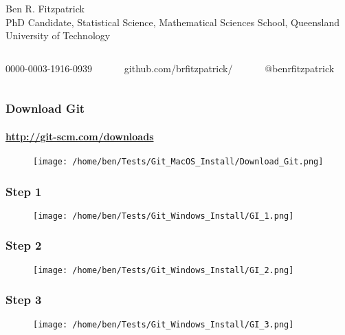 \documentclass[xcolor=dvipsnames]{beamer}
\begin{document}
\begin{frame}
\begin{figure}
\begin{columns}
\end{columns}
\end{figure}

\small Ben R. Fitzpatrick\\
\tiny PhD Candidate, Statistical Science, Mathematical Sciences School, Queensland University of Technology
\newline
\begin{columns}
\begin{column}{3cm}
\tiny 0000-0003-1916-0939
\end{column}
\begin{column}{3cm}
\tiny github.com/brfitzpatrick/
\end{column}
\begin{column}{3cm}
\tiny @benrfitzpatrick
\end{column}
\end{columns}
\end{frame}

\begin{frame}
\frametitle{Download Git}
\framesubtitle{\url{http://git-scm.com/downloads}}
\begin{center}
\begin{figure}
\texttt{[image: /home/ben/Tests/Git\_MacOS\_Install/Download\_Git.png]}
\end{figure}
\end{center}
\end{frame}

\begin{frame}
\frametitle{Step 1}
\begin{center}
\begin{figure}
\texttt{[image: /home/ben/Tests/Git\_Windows\_Install/GI\_1.png]}
\end{figure}
\end{center}
\end{frame}

\begin{frame}
\frametitle{Step 2}
\begin{center}
\begin{figure}
\texttt{[image: /home/ben/Tests/Git\_Windows\_Install/GI\_2.png]}
\end{figure}
\end{center}
\end{frame}

\begin{frame}
\frametitle{Step 3}
\begin{center}
\begin{figure}
\texttt{[image: /home/ben/Tests/Git\_Windows\_Install/GI\_3.png]}
\end{figure}
\end{center}
\end{frame}
\end{document}
